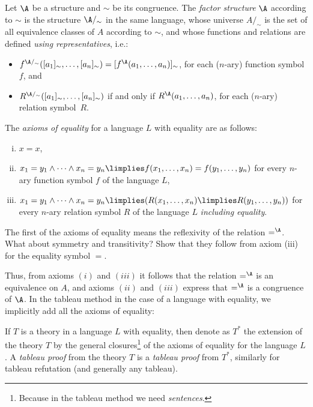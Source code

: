 \begin{definition}
    Let $\A$ be a structure and $\sim$ be its congruence. The \emph{factor structure} $\A$ according to $\sim$ is the structure $\A/_\sim$ in the same language, whose universe $A/_\sim$ is the set of all equivalence classes of $A$ according to $\sim$, and whose functions and relations are defined \emph{using representatives}, i.e.:
    \begin{itemize}
        \item $f^{\A/_\sim}([a_1]_\sim,\dots,[a_n]_\sim)=[f^\A(a_1,\dots,a_n)]_\sim$, for each ($n$-ary) function symbol $f$, and
        \item $R^{\A/_\sim}([a_1]_\sim,\dots,[a_n]_\sim)$ if and only if $R^\A(a_1,\dots,a_n)$, for each ($n$-ary) relation symbol~$R$.
    \end{itemize} 
    
\end{definition}


\begin{definition}
    The \emph{axioms of equality} for a language $L$ with equality are as follows:
    \begin{enumerate}[(i)]
        \item $x=x$,
        \item $x_1=y_1\land\cdots\land x_n=y_n\limplies f(x_1,\dots,x_n)=f(y_1,\dots,y_n)$ for every $n$-ary function symbol $f$ of the language $L$,
        \item $x_1=y_1\land\cdots\land x_n=y_n\limplies (R(x_1,\dots,x_n)\limplies R(y_1,\dots,y_n))$ for every $n$-ary relation symbol $R$ of the language $L$ \emph{including equality}.
    \end{enumerate}
\end{definition}

\begin{exercise}
    The first of the axioms of equality means the reflexivity of the relation $=^\A$. What about symmetry and transitivity? Show that they follow from axiom (iii) for the equality symbol $=$.
\end{exercise}

Thus, from axioms $(i)$ and $(iii)$ it follows that the relation $=^\A$ is an equivalence on $A$, and axioms $(ii)$ and $(iii)$ express that $=^\A$ is a congruence of $\A$. In the tableau method in the case of a language with equality, we implicitly add all the axioms of equality:

\begin{definition}
    If $T$ is a theory in a language $L$ with equality, then denote as $T^*$ the extension of the theory $T$ by the general closures\footnote{Because in the tableau method we need \emph{sentences}.} of the axioms of equality for the language $L$. A \emph{tableau proof} from the theory $T$ is a \emph{tableau proof} from $T^*$, similarly for tableau refutation (and generally any tableau).    
\end{definition}

